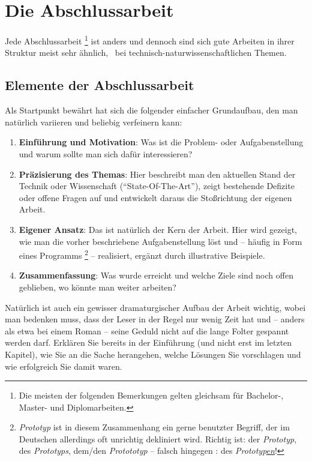 \chapter{Die Abschlussarbeit}
\label{cha:Diplomschrift}

Jede Abschlussarbeit%
\footnote{Die meisten der folgenden Bemerkungen gelten gleichsam für Bachelor-, Master- und Diplomarbeiten.} 
ist anders und dennoch sind sich gute
Arbeiten in ihrer Struktur meist sehr ähnlich, \va\ bei
technisch-natur\-wissen\-schaft\-lichen Themen. 

\section{Elemente der Abschlussarbeit}

Als Startpunkt bewährt hat sich die folgender
einfacher Grundaufbau, den man natürlich vari\-ieren und beliebig
verfeinern kann:
%
\begin{enumerate}
\item \textbf{Einführung und Motivation}: Was ist die Problem- oder Aufgabenstellung und
warum sollte man sich dafür interessieren?
\item \textbf{Präzisierung des Themas}: Hier beschreibt man den aktuellen Stand der Technik
oder Wissenschaft ("`State-Of-The-Art"'), zeigt bestehende
Defizite oder offene Fragen auf und entwickelt daraus die
Stoßrichtung der eigenen Arbeit.
\item \textbf{Eigener Ansatz}: Das ist natürlich der Kern der Arbeit. Hier
wird gezeigt, wie man die vorher beschriebene Aufgabenstellung löst und --
häufig in Form eines Programms%
\footnote{\emph{Prototyp} ist in diesem Zusammenhang ein gerne benutzter Begriff, der im Deutschen
allerdings oft unrichtig dekliniert wird. Richtig ist: der \emph{Prototyp}, des \emph{Prototyps}, dem/den \emph{Protototyp} -- falsch hingegen \zB: des \emph{Prototyp\underline{en}}!
} --
realisiert, ergänzt durch illustrative Beispiele.
\item \textbf{Zusammenfassung}: Was wurde erreicht und welche Ziele sind
noch offen geblieben, wo könnte man weiter arbeiten?
\end{enumerate}
%
Natürlich ist auch ein gewisser dramaturgischer Aufbau der Arbeit
wichtig, wobei man bedenken muss, dass der Leser in der Regel nur
wenig Zeit hat und -- anders als etwa bei einem Roman -- seine
Geduld nicht auf die lange Folter gespannt werden darf. Erklären
Sie bereits in der Einführung (und nicht erst im letzten Kapitel),
wie Sie an die Sache herangehen, welche Lösungen Sie vorschlagen
und wie erfolgreich Sie damit waren.

